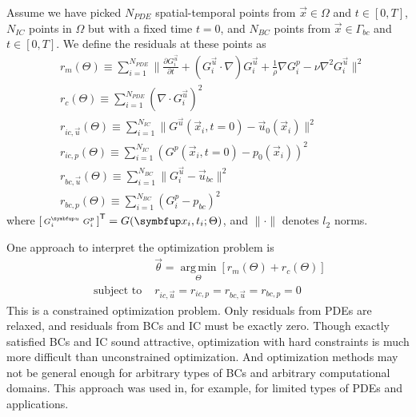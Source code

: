 Assume we have picked $N_{PDE}$ spatial-temporal points from $\vec{x}\in\Omega$ and $t\in[0, T]$, $N_{IC}$ points in $\Omega$ but with a fixed time $t=0$, and $N_{BC}$ points from $\vec{x} \in \Gamma_{bc}$ and $t\in[0, T]$.
We define the residuals at these points as \\
\begin{equation}\label{eq:residual-norms}
    \begin{aligned}
        & r_{m}(\Theta) \equiv \sum\limits_{i=1}^{N_{PDE}} \lVert\frac{\partial G_i^{\vec{u}}}{\partial t}+(G_i^{\vec{u}} \cdot \nabla) G_i^{\vec{u}}+\frac{1}{\rho} \nabla G_i^p -\nu \nabla^{2} G_i^{\vec{u}} \rVert^2 \\
        & r_{c}(\Theta) \equiv \sum\limits_{i=1}^{N_{PDE}} ( \nabla \cdot G_i^{\vec{u}} )^2 \\
        & r_{ic,\vec{u}}(\Theta) \equiv \sum\limits_{i=1}^{N_{IC}} \lVert G^{\vec{u}}(\vec{x}_i, t=0)-\vec{u}_0(\vec{x}_i) \rVert^2 \\
        & r_{ic,p}(\Theta) \equiv \sum\limits_{i=1}^{N_{IC}} ( G^{p}(\vec{x}_i, t=0)-p_0(\vec{x}_i) )^2 \\
        & r_{bc,\vec{u}}(\Theta) \equiv \sum\limits_{i=1}^{N_{BC}} \lVert G_i^{\vec{u}}-\vec{u}_{bc} \rVert^2 \\
        & r_{bc,p}(\Theta) \equiv \sum\limits_{i=1}^{N_{BC}} ( G_i^{p}-p_{bc} )^2
   \end{aligned}
\end{equation}
where $\begin{bsmallmatrix}G_i^{\vec{u}} & G_i^p\end{bsmallmatrix}^\mathsf{T} = G(\vec{x}_i, t_i; \Theta)$, and $\lVert\cdot\rVert$ denotes $l_2$ norms.

One approach to interpret the optimization problem is
\begin{equation}\label{eq:hard-constraint-loss}
    \begin{aligned}
    &\vec{\theta} = \operatorname*{arg\,min}\limits_{\Theta} \left[r_m(\Theta) + r_c(\Theta)\right] \\
    \text{ subject to } &r_{ic,\vec{u}}=r_{ic,p}=r_{bc,\vec{u}}=r_{bc,p}=0
    \end{aligned}
\end{equation}
This is a constrained optimization problem.
Only residuals from PDEs are relaxed, and residuals from BCs and IC must be exactly zero.
Though exactly satisfied BCs and IC sound attractive, optimization with hard constraints is much more difficult than unconstrained optimization.
And optimization methods may not be general enough for arbitrary types of BCs and arbitrary computational domains.
This approach was used in, for example, \cite{lagaris_artificial_1998,McFall2009,mcfall_solving_2010,berg_unified_2018} for limited types of PDEs and applications.

